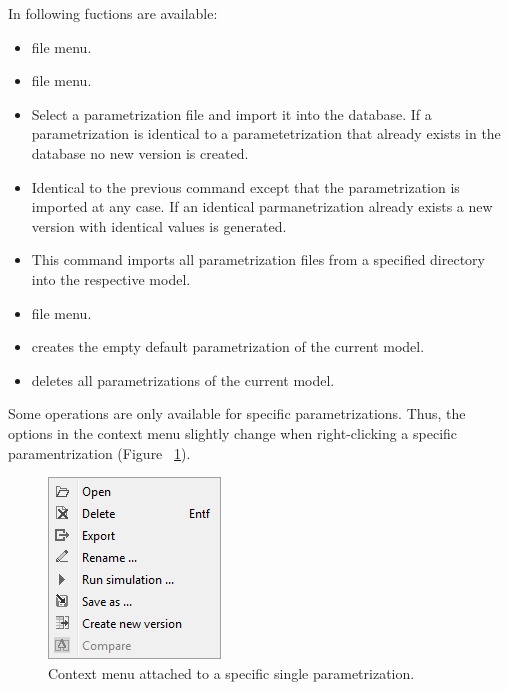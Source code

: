 In following fuctions are available:
\begin{itemize}
\item {} \cf file menu.
\item {} \cf file menu.
\item {} Select a parametrization file and import it into the database. If a parametrization is identical to a parametetrization that already exists in the database no new version is created.
\item {} Identical to the previous command except that the parametrization is imported at any case. If an identical parmanetrization already exists a new version with identical values is generated.
\item {} This command imports all parametrization files from a specified directory into the respective model.
\item {} \cf file menu.
\item {} creates the empty default parametrization of the current model.
\item {} deletes all parametrizations of the current model.
\end{itemize}

Some operations are only available for specific parametrizations. Thus, the options in the context menu slightly change when right-clicking a specific paramentrization (\cf Figure ~\ref{fig:menuParametrizationSingle}).

\begin{figure}[htb]
	\centering
		\includegraphics[scale=0.6]{images/menuParametrizationSingle.png}
	\caption{Context menu attached to a specific single parametrization.}
	\label{fig:menuParametrizationSingle}
\end{figure}

